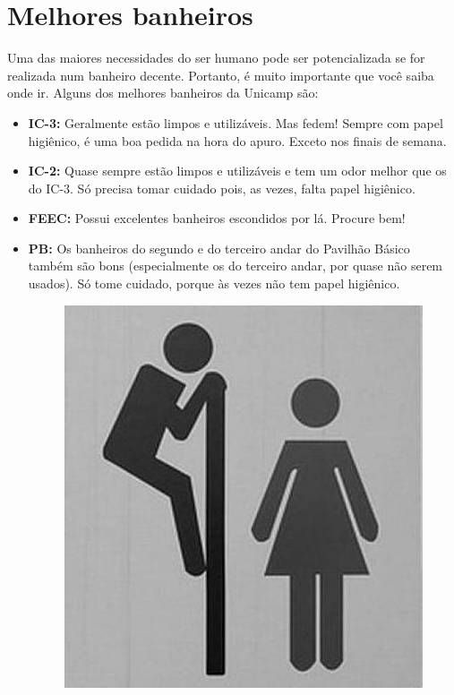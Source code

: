 \newpage
\section{Melhores banheiros}

Uma das maiores necessidades do ser humano pode ser potencializada se for
realizada num banheiro decente. Portanto, é muito importante que você saiba onde
ir. Alguns dos melhores banheiros da Unicamp são:

\begin{itemize}

    \item  \textbf{IC-3:} Geralmente estão limpos e utilizáveis. Mas fedem!
    Sempre com papel higiênico, é uma boa pedida na hora do apuro. Exceto nos
    finais de semana.

    \item  \textbf{IC-2:} Quase sempre estão limpos e utilizáveis e tem um odor
    melhor que os do IC-3. Só precisa tomar cuidado pois, as vezes, falta papel
    higiênico.

    \item  \textbf{FEEC:} Possui excelentes banheiros escondidos por lá. Procure
    bem!

    \item  \textbf{PB:} Os banheiros do segundo e do terceiro andar do Pavilhão
    Básico também são bons (especialmente os do terceiro andar, por quase não
    serem usados). Só tome cuidado, porque às vezes não tem papel higiênico.

    \begin{figure}[h!]
        \centering
        \includegraphics[scale=0.50, keepaspectratio=true]{img/imgs/12-melhores_banheiros/banheiro.jpg}
    \end{figure}


\end{itemize}
